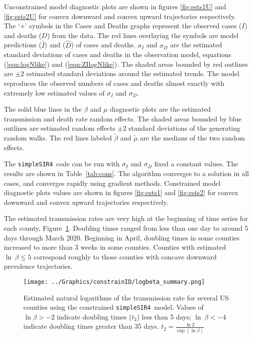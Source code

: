 \documentclass[12pt,letterpaper]{article}
\newcommand\SSm{{\tt simpleSIR4}}
\begin{document}
Unconstrained model diagnostic plots are shown in figures \ref{fig:ests1U} and
\ref{fig:ests2U} for convex downward and convex upward trajectories
respectively.
The `+' symbols in the Cases and Deaths graphs represent the observed
cases ($I$) and deaths ($D$) from the data. 
The red lines overlaying the symbols are model predictions ($\widehat{I}$)
and ($\widehat{D}$) of cases and deaths. 
$\sigma_I$ and $\sigma_D$ are the estimated standard deviations of
cases and deaths in the observation model, equations (\ref{eqn:logNlike}) 
and (\ref{eqn:ZIlogNlike}).
The shaded areas bounded by red outlines are 
$\pm 2$ estimated standard deviations around the estimated trends.
The model reproduces the observed numbers of cases and deaths almost
exactly with extremely low estimated values of $\sigma_I$ and $\sigma_D$.

The solid blue lines in the $\beta$ and $\mu$ diagnostic plots are the estimated
transmission and death rate random effects.
The shaded areas bounded by blue outlines are
estimated random effects $\pm 2$ standard deviations of the generating
random walks.
The red lines labeled $\tilde{\beta}$ and $\tilde{\mu}$ are the
medians of the two random effects.

The \SSm\ code can be run with $\sigma_I$ and $\sigma_D$ fixed a
constant values. The results are shown in Table~\ref{tab:cons}. 
The algorithm converges to a solution in all cases, and converges
rapidly using gradient methods.
Constrained model diagnostic plots
values are shown in figures \ref{fig:ests1} and
\ref{fig:ests2} for convex downward and convex upward trajectories
respectively.

The estimated transmission rates are very high
at the beginning of time series for each county, Figure~\ref{fig:xrates}.
Doubling times  ranged from less than one day to around 5 days
through March 2020. Beginning in April, doubling times in some counties
increased to more than 3 weeks in some counties.
Counties with estimated $\ln~ \beta \le 5$ correspond roughly to those
counties with concave downward prevalence trajectories.


\begin{figure}
\begin{center}
\texttt{[image: ../Graphics/constrainID/logbeta\_summary.png]}\\
\end{center}
\caption{\label{fig:xrates}
Estimated natural logarithms of the transmission rate for several US counties using the
constrained \SSm\ model.
Values of $\ln \beta > -2$ indicate doubling times ($t_2$) less than 5 days;
$\ln~ \beta < -4$ indicate doubling times greater than 35 days.
$t_2 = \frac{\ln 2}{\exp(\ln \beta)}$
}
\end{figure}
\end{document}
